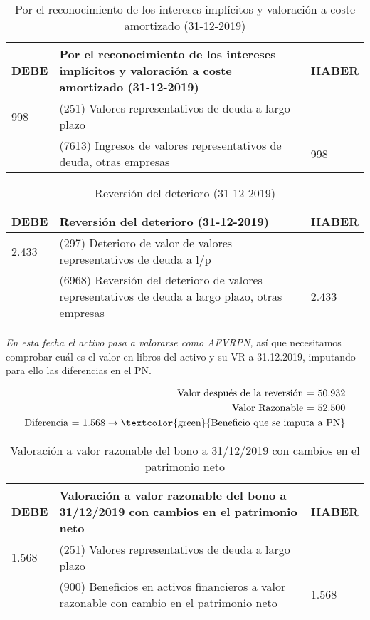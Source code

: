 \begin{table}[H]
    \centering
    \begin{tabular}{|p{2cm}|p{6cm}|p{2cm}|}
    \hline
    \rowcolor{blue!30}
    \textbf{DEBE} & \textbf{Por el reconocimiento de los intereses implícitos y valoración a coste amortizado (31-12-2019)} & \textbf{HABER} \\
    \hline
    998 & (251) Valores representativos de deuda a largo plazo & \\
    \hline
    & (7613) Ingresos de valores representativos de deuda, otras empresas & 998 \\
    \hline
    \end{tabular}
    \caption{Por el reconocimiento de los intereses implícitos y valoración a coste amortizado (31-12-2019)}
    \label{tabla:intereses_implicitos}
\end{table}

\begin{table}[H]
    \centering
    \begin{tabular}{|p{2cm}|p{6cm}|p{2cm}|}
    \hline
    \rowcolor{blue!30}
    \textbf{DEBE} & \textbf{Reversión del deterioro (31-12-2019)} & \textbf{HABER} \\
    \hline
    2.433 & (297) Deterioro de valor de valores representativos de deuda a l/p & \\
    \hline
    & (6968) Reversión del deterioro de valores representativos de deuda a largo plazo, otras empresas & 2.433 \\
    \hline
    \end{tabular}
    \caption{Reversión del deterioro (31-12-2019)}
    \label{tabla:reversion_deterioro}
\end{table}

\textit{En esta fecha el activo pasa a valorarse como AFVRPN,} así que necesitamos comprobar cuál es el valor en libros del activo y su VR a 31.12.2019, imputando para ello las diferencias en el PN.

\begin{align*}
    \text{Valor después de la reversión = 50.932} \\
    \text{Valor Razonable = 52.500} \\
    \text{Diferencia = 1.568} \rightarrow \text{\textcolor{green}{Beneficio que se imputa a PN}}
\end{align*}

\begin{table}[H]
    \centering
    \begin{tabular}{|p{3cm}|p{6cm}|p{3cm}|}
    \hline
    \rowcolor{blue!30}
    \textbf{DEBE} & \textbf{Valoración a valor razonable del bono a 31/12/2019 con cambios en el patrimonio neto} & \textbf{HABER} \\
    \hline
    1.568 & (251) Valores representativos de deuda a largo plazo & \\
    \hline
    & (900) Beneficios en activos financieros a valor razonable con cambio en el patrimonio neto & 1.568\\
    \hline
    \end{tabular}
    \caption{Valoración a valor razonable del bono a 31/12/2019 con cambios en el patrimonio neto}
    \label{tabla:valoracion_bono}
\end{table}

